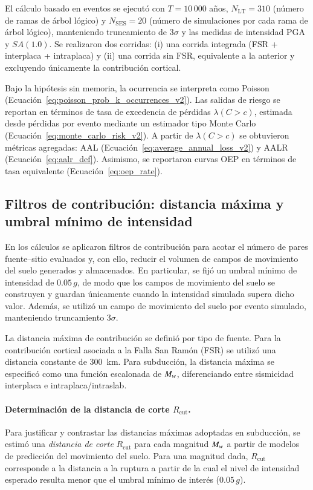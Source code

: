 El cálculo basado en eventos se ejecutó con $T=10\,000$ años, $N_{\text{LT}}=310$ (número de ramas de árbol lógico) y $N_{\text{SES}}=20$ (número de simulaciones por cada rama de árbol lógico), manteniendo truncamiento de $3\sigma$ y las medidas de intensidad PGA y $SA(1.0)$. Se realizaron dos corridas: (i) una corrida integrada (FSR + interplaca + intraplaca) y (ii) una corrida sin FSR, equivalente a la anterior y excluyendo únicamente la contribución cortical.

Bajo la hipótesis sin memoria, la ocurrencia se interpreta como Poisson (Ecuación~\ref{eq:poisson_prob_k_occurrences_v2}). Las salidas de riesgo se reportan en términos de tasa de excedencia de pérdidas $\lambda(C>c)$, estimada desde pérdidas por evento mediante un estimador tipo Monte Carlo (Ecuación~\ref{eq:monte_carlo_risk_v2}). A partir de $\lambda(C>c)$ se obtuvieron métricas agregadas: AAL (Ecuación~\ref{eq:average_annual_loss_v2}) y AALR (Ecuación~\ref{eq:aalr_def}). Asimismo, se reportaron curvas OEP en términos de tasa equivalente (Ecuación~\ref{eq:oep_rate}).

\subsection{Filtros de contribución: distancia máxima y umbral mínimo de intensidad}
\label{sec:meto_event_filtros}

En los cálculos se aplicaron filtros de contribución para acotar el número de pares fuente--sitio evaluados y, con ello, reducir el volumen de campos de movimiento del suelo generados y almacenados. En particular, se fijó un umbral mínimo de intensidad de $0.05\,g$, de modo que los campos de movimiento del suelo se construyen y guardan únicamente cuando la intensidad simulada supera dicho valor. Además, se utilizó un campo de movimiento del suelo por evento simulado, manteniendo truncamiento $3\sigma$.

La distancia máxima de contribución se definió por tipo de fuente. Para la contribución cortical asociada a la Falla San Ramón (FSR) se utilizó una distancia constante de 300~km. Para subducción, la distancia máxima se especificó como una función escalonada de $M_w{}$, diferenciando entre sismicidad interplaca e intraplaca/intraslab.

\paragraph{Determinación de la distancia de corte $R_{\mathrm{cut}}$.}
Para justificar y contrastar las distancias máximas adoptadas en subducción, se estimó una \emph{distancia de corte} $R_{\mathrm{cut}}$ para cada magnitud $M_w{}$ a partir de modelos de predicción del movimiento del suelo. Para una magnitud dada, $R_{\mathrm{cut}}$ corresponde a la distancia a la ruptura a partir de la cual el nivel de intensidad esperado resulta menor que el umbral mínimo de interés ($0.05\,g$).

